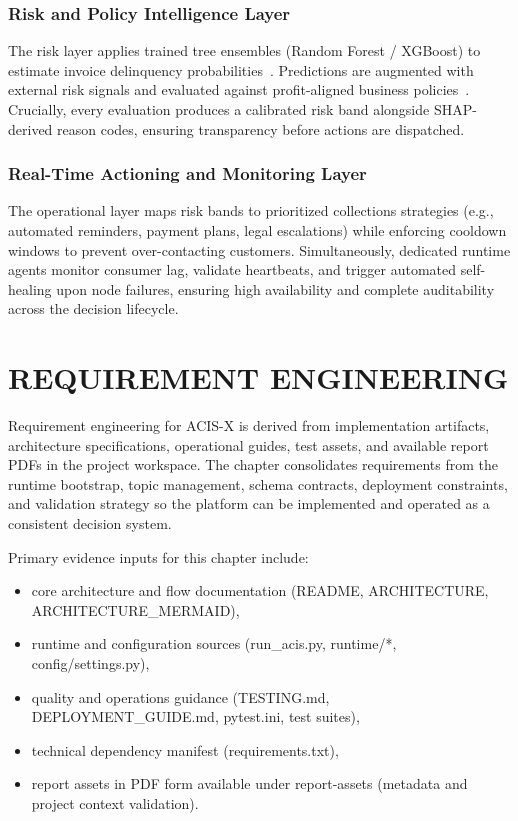 \documentclass[a4paper, 12pt]{report}
\begin{document}
\subsection{Risk and Policy Intelligence Layer}
The risk layer applies trained tree ensembles (Random Forest / XGBoost) to estimate invoice delinquency probabilities~\cite{chen2016xgboost,lessmann2015update}. Predictions are augmented with external risk signals and evaluated against profit-aligned business policies~\cite{verbraken2014profit}. Crucially, every evaluation produces a calibrated risk band alongside SHAP-derived reason codes, ensuring transparency before actions are dispatched.

\subsection{Real-Time Actioning and Monitoring Layer}
The operational layer maps risk bands to prioritized collections strategies (e.g., automated reminders, payment plans, legal escalations) while enforcing cooldown windows to prevent over-contacting customers. Simultaneously, dedicated runtime agents monitor consumer lag, validate heartbeats, and trigger automated self-healing upon node failures, ensuring high availability and complete auditability across the decision lifecycle.
\chapter{REQUIREMENT ENGINEERING}

Requirement engineering for ACIS-X is derived from implementation artifacts, architecture specifications, operational guides, test assets, and available report PDFs in the project workspace. The chapter consolidates requirements from the runtime bootstrap, topic management, schema contracts, deployment constraints, and validation strategy so the platform can be implemented and operated as a consistent decision system.

Primary evidence inputs for this chapter include:
\begin{itemize}[itemsep=2pt]
    \item core architecture and flow documentation (README, ARCHITECTURE, ARCHITECTURE\_MERMAID),
    \item runtime and configuration sources (run\_acis.py, runtime/*, config/settings.py),
    \item quality and operations guidance (TESTING.md, DEPLOYMENT\_GUIDE.md, pytest.ini, test suites),
    \item technical dependency manifest (requirements.txt),
    \item report assets in PDF form available under report-assets (metadata and project context validation).
\end{itemize}
\end{document}

